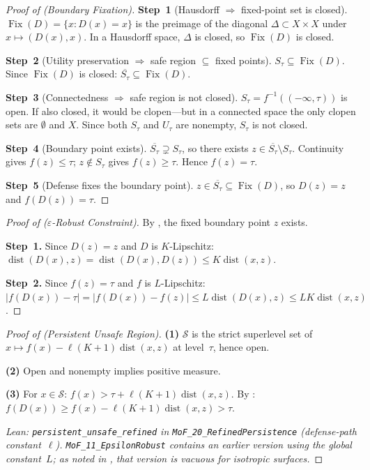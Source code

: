 \documentclass[11pt]{article}
\newcommand{\cl}[1]{\overline{#1}}
\newcommand{\Fix}{\operatorname{Fix}}
\newcommand{\dist}{\operatorname{dist}}
\begin{document}
\begin{proof}[Proof of  (Boundary Fixation)]
\textbf{Step~1} (Hausdorff $\Rightarrow$ fixed-point set is closed).
$\Fix(D) = \{x : D(x) = x\}$ is the preimage of the diagonal
$\Delta \subset X \times X$ under $x \mapsto (D(x), x)$. In a
Hausdorff space, $\Delta$ is closed, so $\Fix(D)$ is closed.

\textbf{Step~2} (Utility preservation $\Rightarrow$ safe region
$\subseteq$ fixed points).
$S_\tau \subseteq \Fix(D)$. Since $\Fix(D)$ is closed:
$\cl{S_\tau} \subseteq \Fix(D)$.

\textbf{Step~3} (Connectedness $\Rightarrow$ safe region is not closed).
$S_\tau = f^{-1}((-\infty,\tau))$ is open. If also closed, it would be
clopen---but in a connected space the only clopen sets are $\emptyset$
and $X$. Since both $S_\tau$ and $U_\tau$ are nonempty, $S_\tau$ is not
closed.

\textbf{Step~4} (Boundary point exists).
$\cl{S_\tau} \supsetneq S_\tau$, so there exists
$z \in \cl{S_\tau} \setminus S_\tau$. Continuity gives
$f(z) \leq \tau$; $z \notin S_\tau$ gives $f(z) \geq \tau$. Hence
$f(z) = \tau$.

\textbf{Step~5} (Defense fixes the boundary point).
$z \in \cl{S_\tau} \subseteq \Fix(D)$, so $D(z) = z$ and
$f(D(z)) = \tau$.
\end{proof}

\begin{proof}[Proof of  ($\varepsilon$-Robust Constraint)]
By , the fixed boundary point $z$ exists.

\textbf{Step~1.} Since $D(z) = z$ and $D$ is $K$-Lipschitz:
$\dist(D(x), z) = \dist(D(x), D(z)) \leq K\dist(x, z)$.

\textbf{Step~2.} Since $f(z) = \tau$ and $f$ is $L$-Lipschitz:
$|f(D(x)) - \tau| = |f(D(x)) - f(z)| \leq L\dist(D(x), z) \leq
LK\dist(x, z)$.
\end{proof}

\begin{proof}[Proof of  (Persistent Unsafe Region)]
\textbf{(1)} $\mathcal{S}$ is the strict superlevel set of
$x \mapsto f(x) - \ell(K+1)\dist(x,z)$ at level~$\tau$, hence open.

\textbf{(2)} Open and nonempty implies positive measure.

\textbf{(3)} For $x \in \mathcal{S}$:
$f(x) > \tau + \ell(K+1)\dist(x,z)$. By :
$f(D(x)) \geq f(x) - \ell(K+1)\dist(x,z) > \tau$.

\noindent\emph{Lean:
\textup{\texttt{persistent\_unsafe\_refined}} in
\textup{\texttt{MoF\_20\_RefinedPersistence}}
(defense-path constant~$\ell$).
\textup{\texttt{MoF\_11\_EpsilonRobust}} contains an earlier version
using the global constant~$L$; as noted in
, that version is vacuous for isotropic surfaces.}
\end{proof}
\end{document}

